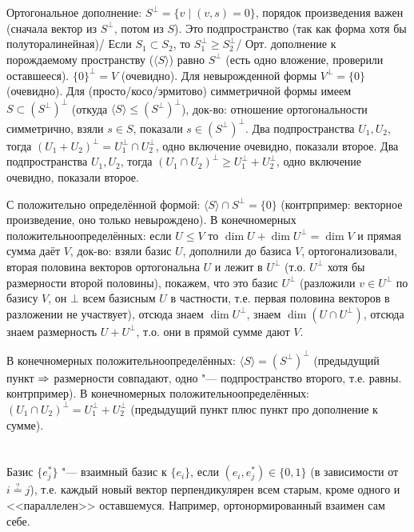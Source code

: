 \section{} %
Ортогональное дополнение: $S^\bot = \{ v \mid (v, s) = 0 \}$, порядок произведения важен (сначала вектор из $S^\bot$, потом из $S$).
Это подпространство (так как форма хотя бы полуторалинейная)/
Если $S_1 \subset S_2$, то $S_1^\bot \ge S_2^\bot$/
Орт. дополнение к порождаемому пространству ($\langle S \rangle$) равно $S^\bot$ (есть одно вложение, проверили оставшееся).
$\{0\}^\bot=V$ (очевидно).
Для невырожденной формы $V^\bot = \{0\}$ (очевидно).
Для (просто/косо/эрмитово) симметричной формы имеем $S \subset (S^\bot)^\bot$ (откуда $\langle S \rangle \le (S^\bot)^\bot$),
док-во: отношение ортогональности симметрично, взяли $s \in S$, показали $s \in (S^\bot)^\bot$.
Два подпространства $U_1, U_2$, тогда $(U_1+U_2)^\bot = U_1^\bot \cap U_2^\bot$, одно включение очевидно, показали второе.
Два подпространства $U_1, U_2$, тогда $(U_1\cap U_2)^\bot \ge U_1^\bot + U_2^\bot$, одно включение очевидно, показали второе.

С положительно определённой формой: $\langle S \rangle \cap S^\bot = \{0\}$ (контрпример: векторное произведение, оно только невырождено).
В конечномерных положительноопределённых: если $U \le V$ то $\dim U + \dim U^\bot = \dim V$ и прямая сумма даёт $V$,
док-во: взяли базис $U$, дополнили до базиса $V$, ортогонализовали, вторая половина векторов ортогональна $U$ и лежит в $U^\bot$
(т.о. $U^\bot$ хотя бы размерности второй половины), покажем, что это базис $U^\bot$ (разложили $v\in U^\bot$ по базису $V$, он $\bot$ всем базисным
$U$ в частности, т.е. первая половина векторов в разложении не участвует), отсюда знаем $\dim U^\bot$, знаем $\dim (U\cap U^\bot)$, отсюда
знаем размерность $U+U^\bot$, т.о. они в прямой сумме дают $V$.

В конечномерных положительноопределённых: $\langle S \rangle = (S^\bot)^\bot$
(предыдущий пункт $\Rightarrow$ размерности совпадают, одно "--- подпространство второго, т.е. равны. \TODO контрпример).
В конечномерных положительноопределённых: $(U_1\cap U_2)^\bot = U_1^\bot + U_2^\bot$ (предыдущий пункт плюс пункт про дополнение к сумме).

\section{} %
Базис $\{e_j^*\}$ "--- взаимный базис к $\{e_i\}$, если $(e_i, e_j^*) \in \{0, 1\}$ (в зависимости от $i\stackrel{?}{=}j$),
т.е. каждый новый вектор перпендикулярен всем старым, кроме одного и <<параллелен>> оставшемуся.
Например, ортонормированный взаимен сам себе.


